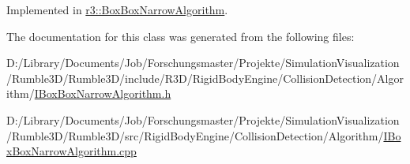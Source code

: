 Implemented in \mbox{\hyperlink{classr3_1_1_box_box_narrow_algorithm_a200098ad4e6e2381f58856002a2d5dec}{r3\+::\+Box\+Box\+Narrow\+Algorithm}}.



The documentation for this class was generated from the following files\+:\begin{DoxyCompactItemize}
\item 
D\+:/\+Library/\+Documents/\+Job/\+Forschungsmaster/\+Projekte/\+Simulation\+Visualization/\+Rumble3\+D/\+Rumble3\+D/include/\+R3\+D/\+Rigid\+Body\+Engine/\+Collision\+Detection/\+Algorithm/\mbox{\hyperlink{_i_box_box_narrow_algorithm_8h}{I\+Box\+Box\+Narrow\+Algorithm.\+h}}\item 
D\+:/\+Library/\+Documents/\+Job/\+Forschungsmaster/\+Projekte/\+Simulation\+Visualization/\+Rumble3\+D/\+Rumble3\+D/src/\+Rigid\+Body\+Engine/\+Collision\+Detection/\+Algorithm/\mbox{\hyperlink{_i_box_box_narrow_algorithm_8cpp}{I\+Box\+Box\+Narrow\+Algorithm.\+cpp}}\end{DoxyCompactItemize}
